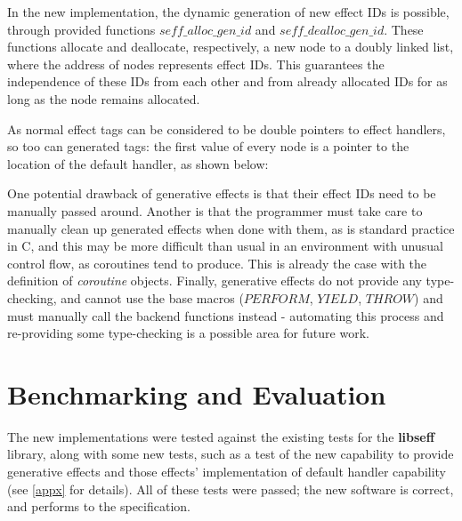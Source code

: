 \documentclass[logo,bsc,singlespacing,parskip,online]{infthesis}
\begin{document}
In the new implementation, the dynamic generation of new effect IDs is possible, through provided functions $seff\_alloc\_gen\_id$ and $seff\_dealloc\_gen\_id$. These functions allocate and deallocate, respectively, a new node to a doubly linked list, where the address of nodes represents effect IDs. This guarantees the independence of these IDs from each other and from already allocated IDs for as long as the node remains allocated.

As normal effect tags can be considered to be double pointers to effect handlers, so too can generated tags: the first value of every node is a pointer to the location of the default handler, as shown below:\todo

One potential drawback of generative effects is that their effect IDs need to be manually passed around. Another is that the programmer must take care to manually clean up generated effects when done with them, as is standard practice in C, and this may be more difficult than usual in an environment with unusual control flow, as coroutines tend to produce. This is already the case with the definition of \textit{coroutine} objects. Finally, generative effects do not provide any type-checking, and cannot use the base macros ($PERFORM$, $YIELD$, $THROW$) and must manually call the backend functions instead - automating this process and re-providing some type-checking is a possible area for future work.





\chapter{Benchmarking and Evaluation} \label{eval}

The new implementations were tested against the existing tests for the \textbf{libseff} library, along with some new tests, such as a test of the new capability to provide generative effects and those effects' implementation of default handler capability (see \cref{appx} for details). All of these tests were passed; the new software is correct, and performs to the specification.
\end{document}
